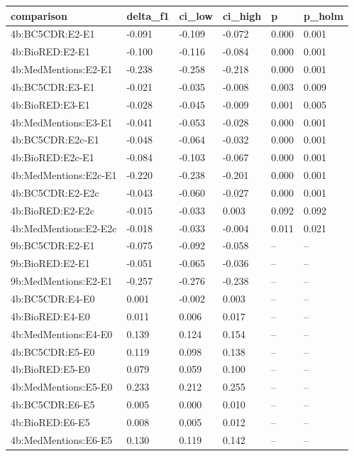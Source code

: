 \begin{table}[t]
\centering
\small
\begin{tabular}{llllll}
\hline
comparison & delta\_f1 & ci\_low & ci\_high & p & p\_holm \\
\hline
4b:BC5CDR:E2-E1 & -0.091 & -0.109 & -0.072 & 0.000 & 0.001 \\
4b:BioRED:E2-E1 & -0.100 & -0.116 & -0.084 & 0.000 & 0.001 \\
4b:MedMentions:E2-E1 & -0.238 & -0.258 & -0.218 & 0.000 & 0.001 \\
4b:BC5CDR:E3-E1 & -0.021 & -0.035 & -0.008 & 0.003 & 0.009 \\
4b:BioRED:E3-E1 & -0.028 & -0.045 & -0.009 & 0.001 & 0.005 \\
4b:MedMentions:E3-E1 & -0.041 & -0.053 & -0.028 & 0.000 & 0.001 \\
4b:BC5CDR:E2c-E1 & -0.048 & -0.064 & -0.032 & 0.000 & 0.001 \\
4b:BioRED:E2c-E1 & -0.084 & -0.103 & -0.067 & 0.000 & 0.001 \\
4b:MedMentions:E2c-E1 & -0.220 & -0.238 & -0.201 & 0.000 & 0.001 \\
4b:BC5CDR:E2-E2c & -0.043 & -0.060 & -0.027 & 0.000 & 0.001 \\
4b:BioRED:E2-E2c & -0.015 & -0.033 & 0.003 & 0.092 & 0.092 \\
4b:MedMentions:E2-E2c & -0.018 & -0.033 & -0.004 & 0.011 & 0.021 \\
9b:BC5CDR:E2-E1 & -0.075 & -0.092 & -0.058 & -- & -- \\
9b:BioRED:E2-E1 & -0.051 & -0.065 & -0.036 & -- & -- \\
9b:MedMentions:E2-E1 & -0.257 & -0.276 & -0.238 & -- & -- \\
4b:BC5CDR:E4-E0 & 0.001 & -0.002 & 0.003 & -- & -- \\
4b:BioRED:E4-E0 & 0.011 & 0.006 & 0.017 & -- & -- \\
4b:MedMentions:E4-E0 & 0.139 & 0.124 & 0.154 & -- & -- \\
4b:BC5CDR:E5-E0 & 0.119 & 0.098 & 0.138 & -- & -- \\
4b:BioRED:E5-E0 & 0.079 & 0.059 & 0.100 & -- & -- \\
4b:MedMentions:E5-E0 & 0.233 & 0.212 & 0.255 & -- & -- \\
4b:BC5CDR:E6-E5 & 0.005 & 0.000 & 0.010 & -- & -- \\
4b:BioRED:E6-E5 & 0.008 & 0.005 & 0.012 & -- & -- \\
4b:MedMentions:E6-E5 & 0.130 & 0.119 & 0.142 & -- & -- \\

\end{tabular}
\end{table}
